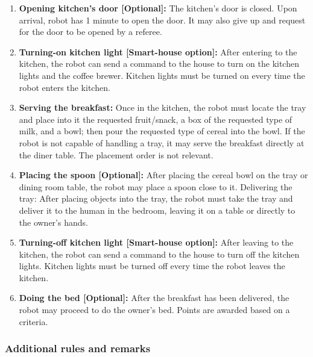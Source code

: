 \begin{enumerate}
\item \textbf{Opening kitchen's door [Optional]:} The kitchen's door is closed. Upon arrival, robot has 1 minute to open the door. It may also give up and request for the door to be opened by a referee.

\item \textbf{Turning-on kitchen light [Smart-house option]:} After entering to the kitchen, the robot can send a command to the house to turn on the kitchen lights and the coffee brewer. Kitchen lights must be turned on every time the robot enters the kitchen.

\item \textbf{Serving the breakfast:} Once in the kitchen, the robot must locate the tray and place into it the requested fruit/snack, a box of the requested type of milk, and a bowl; then pour the requested type of cereal into the bowl. If the robot is not capable of handling a tray, it may serve the breakfast directly at the diner table. The placement order is not relevant.

\item \textbf{Placing the spoon [Optional]:} After placing the cereal bowl on the tray or dining room table, the robot may place a spoon close to it.
Delivering the tray: After placing objects into the tray, the robot must take the tray and deliver it to the human in the bedroom, leaving it on a table or directly to the owner's hands.

\item \textbf{Turning-off kitchen light [Smart-house option]:} After leaving to the kitchen, the robot can send a command to the house to turn off the kitchen lights. Kitchen lights must be turned off every time the robot leaves the kitchen.

\item \textbf{Doing the bed [Optional]:} After the breakfast has been delivered, the robot may proceed to do the owner's bed. Points are awarded based on a  criteria.

\end{enumerate}

\subsubsection{Additional rules and remarks}

